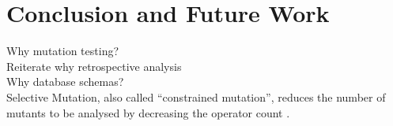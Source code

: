 \section{Conclusion and Future Work}
Why mutation testing? \\
Reiterate why retrospective analysis \\
Why database schemas? \\

Selective Mutation, also called ``constrained mutation'',
reduces the number of mutants to be analysed by decreasing the operator count \cite{jia2011analysis, offutt1993experimental, mathur1991performance}.

%
%




